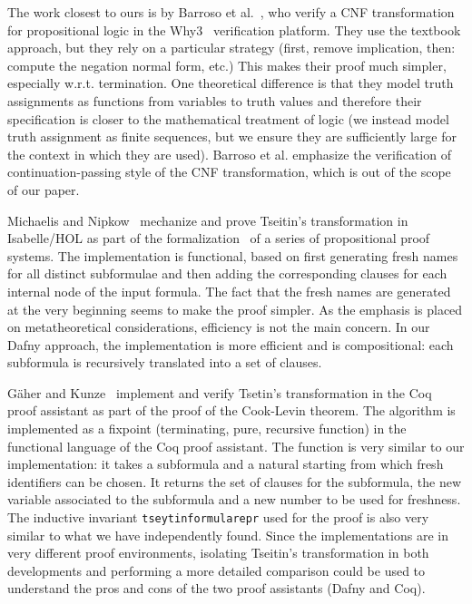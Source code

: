 \documentclass[12pt]{report}
\begin{document}
The work closest to ours is by Barroso et
al.~\cite{DBLP:journals/corr/abs-2003-05081}, who verify a CNF
transformation for propositional logic in the Why3~\cite{why3}
verification platform. They use the textbook approach, but they rely
on a particular strategy (first, remove implication, then: compute the
negation normal form, etc.) This makes their proof much simpler,
especially w.r.t. termination. One theoretical difference is that they
model truth assignments as functions from variables to truth values
and therefore their specification is closer to the mathematical
treatment of logic (we instead model truth assignment as finite
sequences, but we ensure they are sufficiently large for the context
in which they are used). Barroso et al. emphasize the verification of
continuation-passing style of the CNF transformation, which is out of
the scope of our paper.

Michaelis and Nipkow~\cite{DBLP:conf/types/MichaelisN17} mechanize and
prove Tseitin's transformation in Isabelle/HOL as part of the
formalization~\cite{Propositional_Proof_Systems-AFP} of a series of
propositional proof systems. The implementation is functional, based
on first generating fresh names for all distinct subformulae and then
adding the corresponding clauses for each internal node of the input
formula. The fact that the fresh names are generated at the very
beginning seems to make the proof simpler. As the emphasis is placed
on metatheoretical considerations, efficiency is not the main
concern. In our Dafny approach, the implementation is more efficient
and is compositional: each subformula is recursively translated into a
set of clauses.

G\"{a}her and Kunze~\cite{gaher_et_al:LIPIcs.ITP.2021.20} implement
and verify Tsetin's transformation in the Coq proof assistant as part
of the proof of the Cook-Levin theorem. The algorithm is implemented
as a fixpoint (terminating, pure, recursive function) in the
functional language of the Coq proof assistant. The function is very
similar to our implementation: it takes a subformula and a natural
starting from which fresh identifiers can be chosen. It returns the
set of clauses for the subformula, the new variable associated to the
subformula and a new number to be used for freshness. The inductive
invariant \texttt{tseytin\textunderscore formula\textunderscore repr}
used for the proof is also very similar to what we have independently
found. Since the implementations are in very different proof
environments, isolating Tseitin's transformation in both developments
and performing a more detailed comparison could be used to understand
the pros and cons of the two proof assistants (Dafny and Coq).
\end{document}
